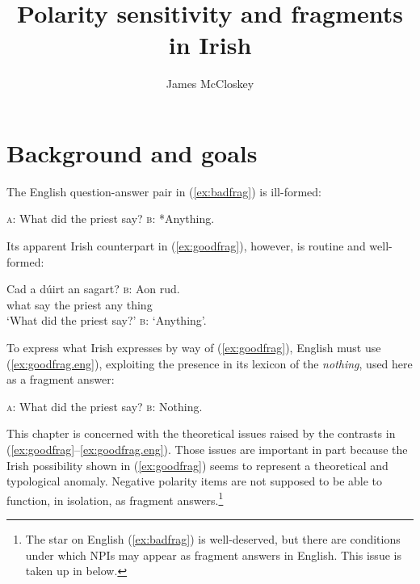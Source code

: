 \documentclass[output=paper,colorlinks,citecolor=brown]{langscibook}
\title{Polarity sensitivity and fragments in Irish}
\author{James McCloskey\affiliation{University of California, Santa Cruz}}
\begin{document}
\maketitle

\section{Background and goals}\label{sec:intro}




The English question-answer pair in (\ref{ex:badfrag}) is ill-formed:

\ea\label{ex:badfrag}
\textsc a:  What did the priest say?
\quad
\textsc b: *Anything.
\z


\noindent Its apparent Irish counterpart in (\ref{ex:goodfrag}), however, is routine and well-formed:

\ea\label{ex:goodfrag}
 Cad a dúirt an sagart? {}{\textsc b:} Aon rud. \\
{}  what {\go} {say\past} the priest {}  any thing \\
 `What did the priest say?' {\textsc b}: `Anything'.
\z


\noindent To express what Irish expresses by way of (\ref{ex:goodfrag}), English must use (\ref{ex:goodfrag.eng}), exploiting the presence in its lexicon of the  {\itshape  nothing}, used here as a fragment answer:

\ea\label{ex:goodfrag.eng}
\textsc{a}: What did the priest say?
\quad
\textsc{b}: Nothing.
\z


\noindent This chapter is concerned with the theoretical issues raised by the contrasts in (\ref{ex:goodfrag}--\ref{ex:goodfrag.eng}).  Those issues are important in part because the Irish possibility shown in (\ref{ex:goodfrag}) seems to represent a theoretical and typological anomaly. Negative polarity items are not supposed to be able to function, in isolation, as fragment answers.\footnote{The star on English (\ref{ex:badfrag}) is well-deserved, but there are conditions under which NPIs may appear as fragment answers in English. This issue is taken up in  below.}
\end{document}
